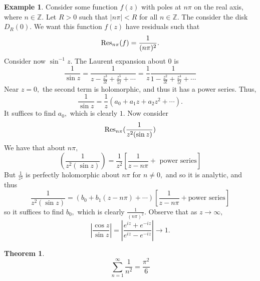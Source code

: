 \documentclass[10pt, oneside]{article}
\newcommand{\bbZ}{\mathbb{Z}}
\theoremstyle{definition}
\newtheorem{exmp}{Example}[section]
\newtheorem{thm}{Theorem}
\newcommand{\bbZ}{\mathbb{Z}}
\begin{document}
\begin{exmp}
    Consider some function $f(z)$ with poles at $n\pi$ on the real axis, where $n \in \bbZ.$ Let $R>0$ such that $|n \pi |< R$ for all $n \in \bbZ.$ The consider the disk $D_R(0).$ We want this function $f(z)$ have residuals such that 
    \[\Res_{n\pi}(f) = \frac{1}{(n\pi )^2}.\] Consider now $\sin^{-1} z.$ The Laurent expansion about $0$ is 
    \[\frac{1}{\sin z} = \frac{1}{z - \frac{z^3}{3!} + \frac{z^5}{5!} + \cdots } = \frac{1}{z}\frac{1}{1 - \frac{z^2}{3!} + \frac{z^4}{5!} + \cdots}\] Near $z = 0,$ the second term is holomorphic, and thus it has a power series. Thus, 
    \[\frac{1}{\sin z} = \frac{1}{z} (a_0 + a_1z + a_2z^2 + \cdots).\] It suffices to find $a_0,$ which is clearly $1.$ Now consider 
    \[\Res_{n \pi} (\frac{1}{z^2(\sin z)})\] We have that about $n\pi,$
    \[(\frac{1}{z^2(\sin z)})=\frac{1}{z^2}\left[ \frac{1}{z - n\pi} + \text{ power series}\right]\] But $\frac{1}{z^2}$ is perfectly holomorphic about $n\pi$ for $n \neq0,$ and so it is analytic, and thus 
    \[\frac{1}{z^2(\sin z)} = (b_0 + b_1(z- n\pi)+ \cdots)\left[\frac{1}{z - n\pi} + \text {power series}\right]\] so it suffices to find $b_0,$ which is clearly $\frac{1}{(n\pi)^2}.$ Observe that as $z\to \infty,$
    \[\left|\frac{\cos z}{\sin z}\right| = \left|\frac{e^{iz}+ e^{-iz}}{e^{iz} - e^{-iz}}\right|\to 1.\] 
\end{exmp}
\begin{thm}
    \[\sum_{n=1}^\infty \frac{1}{n^2} = \frac{\pi^2}{6}\]
\end{thm}
\end{document}
